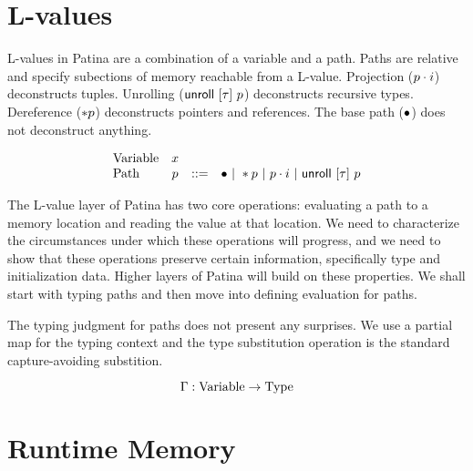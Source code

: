 \section*{L-values}

L-values in Patina are a combination of a variable and a path.
Paths are relative and specify subections of memory reachable from a L-value.
Projection (${p}\cdot{i}$) deconstructs tuples.
Unrolling ($\mathsf{unroll}~[{\tau}]~{p}$) deconstructs recursive types.
Dereference ($*{p}$) deconstructs pointers and references.
The base path ($\bullet$) does not deconstruct anything.

\[
\begin{array}{lccl}
\textrm{Variable} & x & & \\
\textrm{Path} & p & ::= & \bullet ~|~ *{p} ~|~ {p}\cdot{i} ~|~ \mathsf{unroll}~[{\tau}]~{p} \\
\end{array}
\]

The L-value layer of Patina has two core operations: evaluating a path
to a memory location and reading the value at that location.
We need to characterize the circumstances under which these operations will progress,
and we need to show that these operations preserve certain information, specifically
type and initialization data. Higher layers of Patina will build on these properties.
We shall start with typing paths and then move into defining evaluation for paths.

The typing judgment for paths does not present any surprises.
We use a partial map for the typing context and
the type substitution operation is the standard capture-avoiding substition.

$$ \Gamma : \mathrm{Variable} \to \mathrm{Type} $$



\section*{Runtime Memory}

